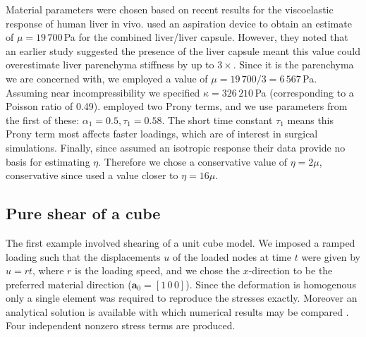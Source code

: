 \bigskip

Material parameters were chosen based on recent results for the viscoelastic response of human liver in vivo. \cite{Nava08} used an aspiration device to obtain an estimate of $\mu = 19\,700\,$Pa for the combined liver/liver capsule. However, they noted that an earlier study suggested the presence of the liver capsule meant this value could overestimate liver parenchyma stiffness by up to $3 \times$. Since it is the parenchyma we are concerned with, we employed a value of $\mu = 19\,700/3 = 6\,567\,$Pa. Assuming near incompressibility we specified $\kappa = 326\,210\,$Pa (corresponding to a Poisson ratio of 0.49). \citeauthor{Nava08} employed two Prony terms, and we use parameters from the first of these: $\alpha_1 = 0.5, \tau_1 = 0.58$. The short time constant $ \tau_1 $ means this Prony term most affects faster loadings, which are of interest in surgical simulations. Finally, since \citeauthor{Nava08} assumed an isotropic response their data provide no basis for estimating $ \eta $. Therefore we chose a conservative value of $\eta = 2\mu$, conservative since \cite{Picinbono01} used a value closer to $\eta = 16\mu$. 


	\subsection{Pure shear of a cube}
The first example involved shearing of a unit cube model. We imposed a ramped loading such that the displacements $u$ of the loaded nodes at time $t$ were given by $u = rt$, where $r$ is the loading speed, and we chose the $x$-direction to be the preferred material direction ($\mathbf{a}_0 = [1\, 0\, 0 ]$). Since the deformation is homogenous only a single element was required to reproduce the stresses exactly. Moreover an analytical solution is available with which numerical results may be compared \citep{Taylor2009}. Four independent nonzero stress terms are produced. 
	
